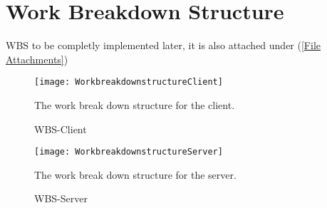 \section{Work Breakdown Structure}\label{Work Breakdown Structure}
    WBS to be completly implemented later, it is also attached under (\ref{File Attachments})
    
        \begin{figure}[H]
            \centering
            \texttt{[image: WorkbreakdownstructureClient]}
            \caption{WBS-Client}
            The work break down structure for the client.
            \label{fig:WorkbreakdownstructureClient}
        \end{figure}
        
        \begin{figure}[H]
            \centering
            \texttt{[image: WorkbreakdownstructureServer]}
            \caption{WBS-Server}
            The work break down structure for the server.
            \label{fig:WorkbreakdownstructureServer}
        \end{figure}
